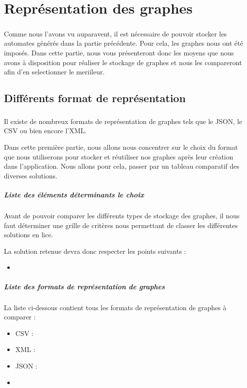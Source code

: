 \chapter{Représentation des graphes}
\paragraph{}
Comme nous l'avons vu auparavent, il est nécessaire de pouvoir stocker les automates générés dans la partie précédente. Pour cela, les graphes nous ont été imposés. Dans cette partie, nous vous présenteront donc les moyens que nous avons à disposition pour réaliser le stockage de graphes et nous les compareront afin d'en selectionner le meriileur.

\section{Différents format de représentation}
  \paragraph{}
  Il existe de nombreux formats de représentation de graphes tels que le JSON, le CSV ou bien encore l'XML.
  
  Dans cette première partie, nous allons nous concentrer sur le choix du format que nous utiliserons pour stocker et réutiliser nos graphes après leur création dans l'application.
  Nous allons pour cela, passer par un tableau comparatif des diverses solutions.
  
  \paragraph{Liste des éléments déterminants le choix}
  Avant de pouvoir comparer les différents types de stockage des graphes, il nous faut déterminer une grille de critères nous permettant de classer les différentes solutions en lice.
  
  La solution retenue devra donc respecter les points suivants : 
  \begin{itemize}
   \item 
  \end{itemize}

  \paragraph{Liste des formats de représentation de graphes}
  La liste ci-dessous contient tous les formats de représentation de graphes à comparer : 
  \begin{itemize}
   \item CSV : 
   \item XML : 
   \item JSON :
   \item 
  \end{itemize}

